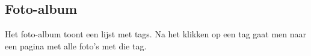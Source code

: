 \subsection{Foto-album}\label{fotoalbum}

Het foto-album toont een lijst met tags. Na het klikken op een tag gaat men naar een pagina met alle foto's met die tag.

